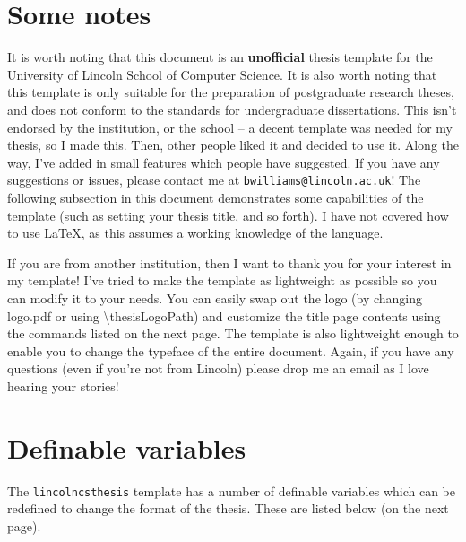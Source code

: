 \section{Some notes}
It is worth noting that this document is an \textbf{unofficial} thesis template for the University of Lincoln School of Computer Science. It is also worth noting that this template is only suitable for the preparation of postgraduate research theses, and does not conform to the standards for undergraduate dissertations. This isn't endorsed by the institution, or the school -- a decent template was needed for my thesis, so I made this. Then, other people liked it and decided to use it. Along the way, I've added in small features which people have suggested. If you have any suggestions or issues, please contact me at \texttt{bwilliams@lincoln.ac.uk}! The following subsection in this document demonstrates some capabilities of the template (such as setting your thesis title, and so forth). I have not covered how to use \LaTeX, as this assumes a working knowledge of the language.

If you are from another institution, then I want to thank you for your interest in my template! I've tried to make the template as lightweight as possible so you can modify it to your needs. You can easily swap out the logo (by changing logo.pdf or using \textbackslash thesisLogoPath) and customize the title page contents using the commands listed on the next page. The template is also lightweight enough to enable you to change the typeface of the entire document. Again, if you have any questions (even if you're not from Lincoln) please drop me an email as I love hearing your stories!

\section{Definable variables}
The \texttt{lincolncsthesis} template has a number of definable variables which can be redefined to change the format of the thesis. These are listed below (on the next page).

